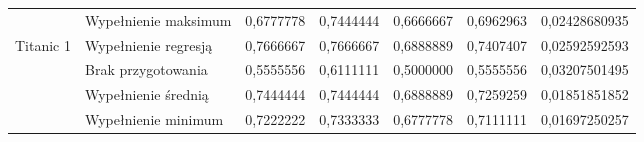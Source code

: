 \documentclass{book}
\begin{document}
\begin{table}[H]
\begin{tabular}{|l|l|r|r|r|r|r|}
                                & Wypełnienie maksimum & 0,6777778                                                                        & 0,7444444                                                                                & 0,6666667                                                                                          & 0,6962963                                                                       & 0,02428680935                                                                    \\ \cline{2-7} 
    \multirow{-5}{*}{Titanic 1} & Wypełnienie regresją & 0,7666667                                                                        & \cellcolor[HTML]{67FD9A}0,7666667                                                        & \cellcolor[HTML]{67FD9A}0,6888889                                                                  & \cellcolor[HTML]{FFCC67}0,7407407                                               & \cellcolor[HTML]{FFCC67}0,02592592593                                            \\ \hline
                                & Brak przygotowania   & 0,5555556                                                                        & 0,6111111                                                                                & 0,5000000                                                                                          & 0,5555556                                                                       & 0,03207501495                                                                    \\ \cline{2-7} 
                                & Wypełnienie średnią  & 0,7444444                                                                        & \cellcolor[HTML]{67FD9A}0,7444444                                                        & \cellcolor[HTML]{67FD9A}0,6888889                                                                  & 0,7259259                                                                       & 0,01851851852                                                                    \\ \cline{2-7} 
                                & Wypełnienie minimum  & 0,7222222                                                                        & 0,7333333                                                                                & 0,6777778                                                                                          & 0,7111111                                                                       & 0,01697250257                                                                    \\ \cline{2-7} 

\end{tabular}
\end{table}
\end{document}

